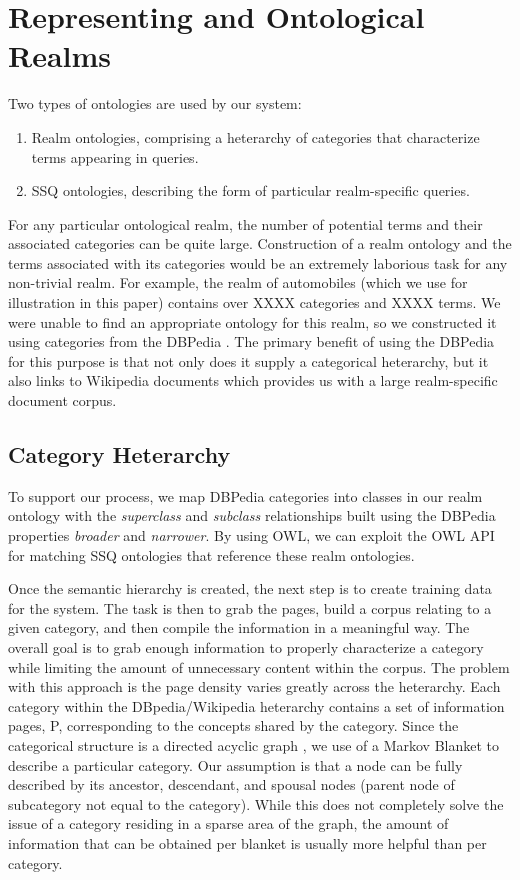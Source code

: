 \section{Representing and Ontological Realms}
Two types of ontologies are used by our system:
\begin{enumerate}
\item Realm ontologies, comprising a heterarchy of categories that
  characterize terms appearing in queries.
\item SSQ ontologies, describing the form of particular
  realm-specific queries.
\end{enumerate}
For any particular ontological realm, the number of potential
terms and their associated categories can be quite large.
Construction of a realm ontology and the terms associated
with its categories would be an extremely laborious task
for any non-trivial realm. For example, the realm of automobiles (which
we use for illustration in this paper) contains 
over XXXX categories and XXXX terms. We were unable to find
an appropriate ontology for this realm, so we constructed it
using categories from the DBPedia \cite{Auer07dbpedia:a}.
The primary benefit of using the DBPedia for this purpose is
that not only does it supply a categorical heterarchy, but it
also links to Wikipedia documents which provides us with a large
realm-specific document corpus.

\subsection{Category Heterarchy} 

To support our process, we map DBPedia categories into classes in our realm ontology with the \textit{superclass} and \textit{subclass} relationships built using the DBPedia properties \textit{broader} and \textit{narrower}. By using OWL, we can exploit the OWL API for matching SSQ ontologies that reference these realm ontologies.


Once the semantic hierarchy is created, the next step is to create
training data for the system. The task is then to grab the pages,
build a corpus relating to a given category, and then compile the
information in a meaningful way. The overall goal is to grab enough
information to properly characterize a category while limiting the
amount of unnecessary content within the corpus. The problem with this
approach is the page density varies greatly across the
heterarchy. Each category within the DBpedia/Wikipedia heterarchy
contains a set of information pages, P, corresponding to the concepts shared by the category. Since the categorical structure is a directed acyclic graph \cite{Suchanek07yago:a}, we use of a Markov Blanket \cite{Friedman97bayesiannetwork} to describe
a particular category. Our assumption is that a
node can be fully described by its ancestor, descendant, and spousal
nodes (parent node of subcategory not equal to the category). While
this does not completely solve the issue of a category residing in a
sparse area of the graph, the amount of information that can be
obtained per blanket is usually more helpful than per category.



